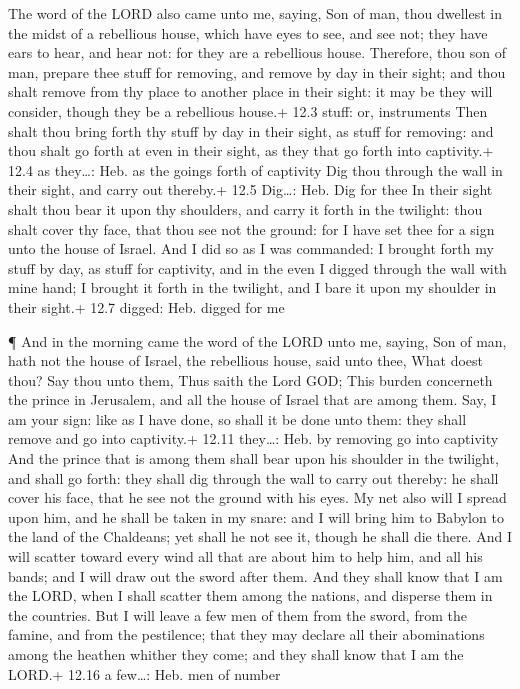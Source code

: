  The word of the LORD also came unto me, saying,
 Son of man, thou dwellest in the midst of a rebellious
house, which have eyes to see, and see not; they have ears to hear, and
hear not: for they are a rebellious house.  Therefore, thou
son of man, prepare thee stuff for removing, and remove by day in their
sight; and thou shalt remove from thy place to another place in their
sight: it may be they will consider, though they be a rebellious house.+
12.3 stuff: or, instruments  Then shalt thou bring forth thy
stuff by day in their sight, as stuff for removing: and thou shalt go
forth at even in their sight, as they that go forth into captivity.+
12.4 as they\ldots: Heb. as the goings forth of captivity 
Dig thou through the wall in their sight, and carry out thereby.+ 12.5
Dig\ldots: Heb. Dig for thee  In their sight shalt thou bear
it upon thy shoulders, and carry it forth in the twilight: thou shalt
cover thy face, that thou see not the ground: for I have set thee for a
sign unto the house of Israel.  And I did so as I was
commanded: I brought forth my stuff by day, as stuff for captivity, and
in the even I digged through the wall with mine hand; I brought it forth
in the twilight, and I bare it upon my shoulder in their sight.+ 12.7
digged: Heb. digged for me

 ¶ And in the morning came the word of the LORD unto me,
saying,  Son of man, hath not the house of Israel, the
rebellious house, said unto thee, What doest thou?  Say
thou unto them, Thus saith the Lord GOD; This burden concerneth the
prince in Jerusalem, and all the house of Israel that are among them.
 Say, I am your sign: like as I have done, so shall it be
done unto them: they shall remove and go into captivity.+ 12.11
they\ldots: Heb. by removing go into captivity  And the
prince that is among them shall bear upon his shoulder in the twilight,
and shall go forth: they shall dig through the wall to carry out
thereby: he shall cover his face, that he see not the ground with his
eyes.  My net also will I spread upon him, and he shall be
taken in my snare: and I will bring him to Babylon to the land of the
Chaldeans; yet shall he not see it, though he shall die there.
 And I will scatter toward every wind all that are about
him to help him, and all his bands; and I will draw out the sword after
them.  And they shall know that I am the LORD, when I shall
scatter them among the nations, and disperse them in the countries.
 But I will leave a few men of them from the sword, from
the famine, and from the pestilence; that they may declare all their
abominations among the heathen whither they come; and they shall know
that I am the LORD.+ 12.16 a few\ldots: Heb. men of number

